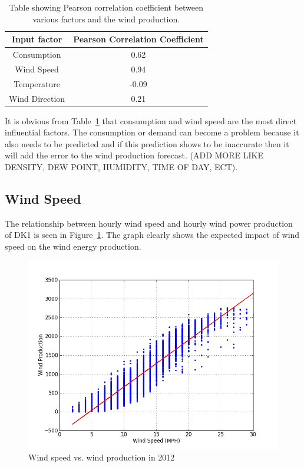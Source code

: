 \begin{table}[H]
\centering  %
\begin{tabular}{c c} %
Input factor & Pearson Correlation Coefficient \\ [0.5ex] %
\hline                  %
Consumption & 0.62 \\ %
Wind Speed & 0.94 \\
Temperature & -0.09 \\
Wind Direction & 0.21 \\ [1ex] %
\hline %
\end{tabular}
\caption{Table showing Pearson correlation coefficient between various factors and the wind production.} %
\label{table:pearsonCoeficientWindProduction} %
\end{table}

It is obvious from Table~\ref{table:pearsonCoeficientWindProduction} that consumption and wind speed are the most direct influential factors. The consumption or demand can become a problem because it also needs to be predicted and if this prediction shows to be inaccurate then it will add the error to the wind production forecast.  (ADD MORE LIKE DENSITY, DEW POINT, HUMIDITY, TIME OF DAY, ECT).

\subsection{Wind Speed}
The relationship between hourly wind speed and hourly wind power production of DK1 is seen in Figure~\ref{fig:windVsProd}. The graph clearly shows the expected impact of wind speed on the wind energy production.

\begin{figure}[H]
\centering
\includegraphics[width=0.99\linewidth,natwidth=898,natheight=587]{billeder/WindSpeedVsProduction.png}
\caption{Wind speed vs. wind production in 2012}
\label{fig:windVsProd}
\end{figure}


